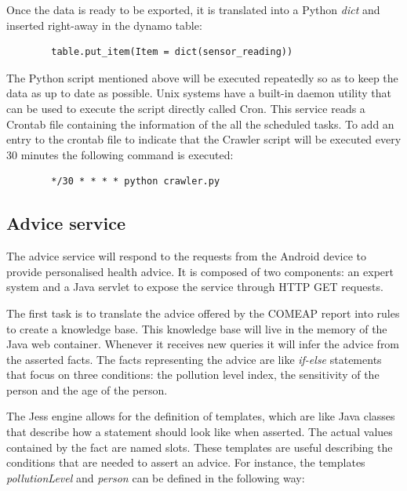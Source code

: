 Once the data is ready to be exported, it is translated into a Python \textit{dict} and inserted right-away in the dynamo table: \bigskip

{\centering
\begin{BVerbatim}
        table.put_item(Item = dict(sensor_reading))
\end{BVerbatim}
\par
}\bigskip


The Python script mentioned above will be executed repeatedly so as to keep the data as up to date as possible. Unix systems have a built-in daemon utility that can be used to execute the script directly called Cron. This service reads a Crontab file containing the information of the all the scheduled tasks. To add an entry to the crontab file to indicate that the Crawler script will be executed every 30 minutes the following command is executed: \bigskip

{\centering
\begin{BVerbatim}
        */30 * * * * python crawler.py
\end{BVerbatim}
\par
}

\subsection{Advice service}
The advice service will respond to the requests from the Android device to provide personalised health advice. It is composed of two components: an expert system and a Java servlet to expose the service through HTTP GET requests. 

The first task is to translate the advice offered by the COMEAP report into rules to create a knowledge base. This knowledge base will live in the memory of the Java web container. Whenever it receives new queries it will infer the advice from the asserted facts. The facts representing the advice are like \textit{if-else} statements that focus on three conditions: the pollution level index, the sensitivity of the person and the age of the person. 

The Jess engine allows for the definition of templates, which are like Java classes that describe how a statement should look like when asserted. The actual values contained by the fact are named slots. These templates are useful describing the conditions that are needed to assert an advice. For instance, the templates \textit{pollutionLevel} and \textit{person} can be defined in the following way: 

